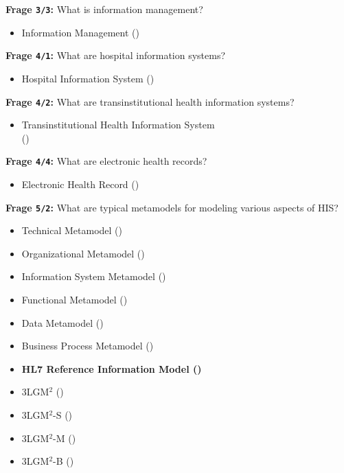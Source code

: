 \textbf{Frage \texttt{3/3}:} What is information management?

\begin{itemize}
  \item Information Management ()
\end{itemize}

\textbf{Frage \texttt{4/1}:} What are hospital information systems?

\begin{itemize}
  \item Hospital Information System ()
\end{itemize}

\textbf{Frage \texttt{4/2}:} What are transinstitutional health information systems?

\begin{itemize}
  \item Transinstitutional Health Information System \\
  () %
\end{itemize}

\textbf{Frage \texttt{4/4}:} What are electronic health records?

\begin{itemize}
  \item Electronic Health Record ()
\end{itemize}

\textbf{Frage \texttt{5/2}:} What are typical metamodels for modeling various aspects of HIS?

\begin{itemize}
  \item Technical Metamodel ()
  \item Organizational Metamodel ()
  \item Information System Metamodel ()
  \item Functional Metamodel ()
  \item Data Metamodel ()
  \item Business Process Metamodel ()
  \item \textbf{ HL7 Reference Information Model ()}
  \item 3LGM$^{2}$ ()
  \item 3LGM$^{2}$-S ()
  \item 3LGM$^{2}$-M ()
  \item 3LGM$^{2}$-B ()
\end{itemize}

